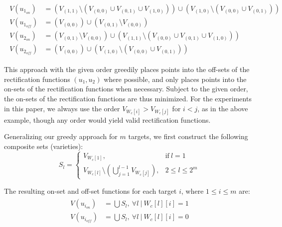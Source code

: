 \begin{small}
\begin{align*}
  \begin{split}
    V(u_{1_{on}})&= (V_{(1,1)} \setminus (V_{(0,0)} \cup V_{(0,1)} \cup V_{(1,0)})) \cup (V_{(1,0)} \setminus (V_{(0,0)} \cup V_{(0,1)}))\\
    V(u_{1_{off}}) &= (V_{(0,0)}) \cup (V_{(0,1)} \setminus V_{(0,0)}) \\
    V(u_{2_{on}})&= (V_{(0,1)} \setminus V_{(0,0)}) \cup (V_{(1,1)} \setminus (V_{(0,0)} \cup V_{(0,1)} \cup V_{(1,0)}))\\
    V(u_{2_{off}}) &= (V_{(0,0)}) \cup (V_{(1,0)} \setminus (V_{(0,0)} \cup V_{(0,1)}))
  \end{split}
\end{align*}
\end{small}

This approach with the given order greedily places points into the off-sets of the rectification functions $(u_1, u_2)$ where possible, and only places points into the on-sets of the rectification functions when necessary. 
Subject to the given order, the on-sets of the rectification functions are thus minimized. For the experiments in this paper, we always use the order
$V_{W_c[i]} > V_{W_c[j]}$ for $i < j$, as in the above example, though any order would yield valid rectification functions. 

Generalizing our greedy approach for $m$ targets, we first
construct the following composite sets (varieties):
\begin{equation}
  \label{eqn:composite_greedy}
  S_l=
  \begin{cases}
    V_{W_c[1]},                                                & \text{if}\ l=1   \\
    V_{W_c[l]} \setminus (\bigcup\limits_{j=1}^{l-1}V_{W_c[j]}), & 2\leq l \leq 2^m
  \end{cases}
\end{equation}

The resulting on-set and off-set functions for each target $i$, where $1 \leq i \leq m$ are: 
\begin{align}
  \label{eqn:ui_on_off}
  \begin{split}
  V(u_{i_{on}}) &= \bigcup S_l,~\forall l~|~W_c[l][i]=1 \\
  V(u_{i_{off}}) &= \bigcup S_l,~\forall l~|~W_c[l][i]=0
  \end{split}
\end{align}

